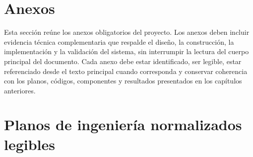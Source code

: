 \documentclass[12pt,letterpaper]{report}
\begin{document}
\appendix
\renewcommand{\appendixname}{Anexo}

\chapter*{Anexos}

\begin{instrucciones}
Esta sección reúne los anexos obligatorios del proyecto. Los anexos deben incluir evidencia técnica complementaria que respalde el diseño, la construcción, la implementación y la validación del sistema, sin interrumpir la lectura del cuerpo principal del documento. Cada anexo debe estar identificado, ser legible, estar referenciado desde el texto principal cuando corresponda y conservar coherencia con los planos, códigos, componentes y resultados presentados en los capítulos anteriores.
\end{instrucciones}

\chapter{Planos de ingeniería normalizados legibles}
\end{document}
